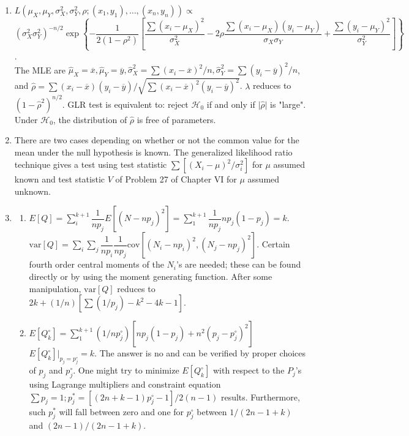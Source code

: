 \begin{enumerate}
	\item[34.] $L(\mu_X,\mu_Y,\sigma_X^2,\sigma_Y^2,\rho; (x_1,y_1),\ldots,(x_n,y_n)) \propto$ \\
	$(\sigma_X^2\sigma_Y^2)^{-n/2}\exp\left\{-\dfrac{1}{2(1-\rho^2)}\left[\dfrac{\sum(x_i-\mu_X)^2}{\sigma_X^2} -2\rho\dfrac{\sum(x_i-\mu_X)(y_i-\mu_Y)}{\sigma_X\sigma_Y} + \dfrac{\sum(y_i-\mu_Y)^2}{\sigma^2_Y}\right]\right\}$. \\
	The MLE are $\hat{\mu}_X=\overline{x},\hat{\mu}_Y=\overline{y}, \hat{\sigma}^2_X=\sum(x_i-\overline{x})^2/n, \hat{\sigma}^2_Y=\sum(y_i-\overline{y})^2/n$, and $\hat{\rho} = \sum(x_i-\overline{x})(y_i-\overline{y})/\sqrt{\sum(x_i-\overline{x})^2(y_i-\overline{y})^2}$. $\lambda$ reduces to $(1-\hat{\rho}^2)^{n/2}$. GLR test is equivalent to: reject $\mathscr{H}_0$ if and only if $\vert\hat{\rho}\vert$ is "large".  Under $\mathscr{H}_0$, the distribution of $\hat{\rho}$ is free of parameters. 
	
	\item[35.] There are two cases depending on whether or not the common value for the mean under the null hypothesis is known. The generalized likelihood ratio technique gives a test using test statistic $\sum[(X_i-\mu)^2/\sigma_i^2]$ for $\mu$ assumed known and test statistic $V$ of Problem 27 of Chapter VI for $\mu$ assumed unknown.
	
	\item[39.] \begin{enumerate}
		\item[(a)] $E[Q] = \sum\limits_{i}^{k+1}\dfrac{1}{np_j}E[(N-np_j)^2] = \sum\limits_{1}^{k+1}\dfrac{1}{np_j}np_j(1-p_j) = k$. \\
		$\mbox{var}[Q] = \sum\limits_{i}\sum\limits_{j}\dfrac{1}{np_i}\dfrac{1}{np_j}\mbox{cov}[(N_i-np_i)^2,(N_j-np_j)^2]$. Certain fourth order central moments of the $N_i$'s are needed; these can be found directly or by using the moment generating function. After some manipulation, $\mbox{var}[Q]$ reduces to $2k+(1/n)[\sum(1/p_j) - k^2 -4k -1]$.
	
	\newpage
	
		\item[(b)] $E[Q^\circ_k] = \sum\limits_{1}^{k+1}(1/np^\circ_j)[np_j(1-p_j) + n^2(p_j-p^\circ_j)^2]$ \\
		$E[Q^\circ_k]\Big\vert_{p_j=p^\circ_j} = k$. The answer is no and can be verified by proper choices of $p_j$ and $p^\circ_j$. One might try to minimize $E[Q^\circ_k]$ with respect to the $P_j$'s using Lagrange multipliers and constraint equation $\sum p_j = 1; p_j^*= [(2n+k-1)p^\circ_j-1]/2(n-1)$ results. Furthermore, such $p^*_j$ will fall between zero and one for $p^\circ_j$ between $1/(2n-1+k)$ and $(2n-1)/(2n-1+k)$.
		

\end{enumerate}
\end{enumerate}
